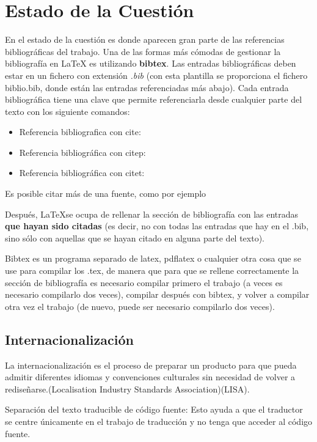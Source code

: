 \chapter{Estado de la Cuestión}
\label{cap:estadoDeLaCuestion}

En el estado de la cuestión es donde aparecen gran parte de las referencias bibliográficas del trabajo. Una de las formas más cómodas de gestionar la bibliografía en {\LaTeX} es utilizando \textbf{bibtex}. Las entradas bibliográficas deben estar en un fichero con extensión \textit{.bib} (con esta plantilla se proporciona el fichero biblio.bib, donde están las entradas referenciadas más abajo). Cada entrada bibliográfica tiene una clave que permite referenciarla desde cualquier parte del texto con los siguiente comandos:

\begin{itemize}
\item Referencia bibliografica con cite: \cite{ldesc2e}
\item Referencia bibliográfica con citep: \citep{notsoshort}
\item Referencia bibliográfica con citet: \citet{latexAPrimer}
\end{itemize}

Es posible citar más de una fuente, como por ejemplo \citep{latexCompanion,LaTeXLamport,texKnuth}

Después, \LaTeX se ocupa de rellenar la sección de bibliografía con las entradas \textbf{que hayan sido citadas} (es decir, no con todas las entradas que hay en el .bib, sino sólo con aquellas que se hayan citado en alguna parte del texto).

Bibtex es un programa separado de latex, pdflatex o cualquier otra cosa que se use para compilar los .tex, de manera que para que se rellene correctamente la sección de bibliografía es necesario compilar primero el trabajo (a veces es necesario compilarlo dos veces), compilar después con bibtex, y volver a compilar otra vez el trabajo (de nuevo, puede ser necesario compilarlo dos veces). 

\section{Internacionalización}
La internacionalización es el proceso de preparar un producto para que pueda admitir diferentes idiomas y convenciones culturales sin necesidad de volver a rediseñarse.(Localisation Industry Standards Association)(LISA).

Separación del texto traducible de código fuente: Esto ayuda a que el traductor se centre únicamente en el trabajo de traducción y no tenga que acceder al código fuente.

